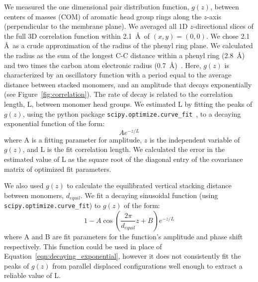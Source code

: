 \documentclass[journal=jpcbfk,manuscript=article]{achemso}
\begin{document}
  We measured the one dimensional pair distribution function, $g(z)$, between centers 
  of masses (COM) of aromatic head group rings along the $z$-axis (perpendicular to
  the membrane plane). We averaged all 1D $z$-directional slices of the full 3D 
  correlation function within 2.1~\AA~of $(x, y)=(0, 0)$. We chose 2.1 \AA~as a crude 
  approximation of the radius of the phenyl ring plane. 
  We calculated the radius as the sum of the longest C-C distance within a phenyl 
  ring (2.8~\AA) and two times the carbon atom electronic radius (0.7~\AA)~\cite{slater_atomic_1964}.
  Here, $g(z)$ is characterized by an oscillatory function with a period equal to the
  average distance between stacked monomers, and an amplitude that decays exponentially
  (see Figure~\ref{fig:correlation}). The rate of decay is related to the correlation 
  length, L, between monomer head groups. We estimated L by fitting the peaks of $g(z)$,
  using the python package \texttt{scipy.optimize.curve\_fit}~\cite{oliphant_python_2007},
  to a decaying exponential function of the form:
  \begin{equation}
  	Ae^{-z/L}
  	\label{eqn:decaying_exponential}
  \end{equation}
  where A is a fitting parameter for amplitude, $z$ is the independent variable of $g(z)$, 
  and L is the fit correlation length. We calculated the error in the estimated value
  of L as the square root of the diagonal entry of the covariance matrix of 
  optimized fit parameters.
  
  We also used $g(z)$ to calculate the equilibrated vertical stacking distance between
  monomers, $d_{equil}$. 
  We fit a decaying sinusoidal function (using \texttt{scipy.optimize.curve\_fit}) to 
  $g(z)$ of the form:
  \begin{equation}
  	1 - A\cos\left(\frac{2\pi}{\mathit{d}_{equil}}z + B\right)e^{-z/L}
  	\label{eqn:decaying_sinusoid}
  \end{equation}
  where A and B are fit parameters for the function's amplitude and phase shift respectively.
  This function could be used in place of Equation~\ref{eqn:decaying_exponential}, however
  it does not consistently fit the peaks of $g(z)$ from parallel displaced configurations 
  well enough to extract a reliable value of L.
\end{document}

